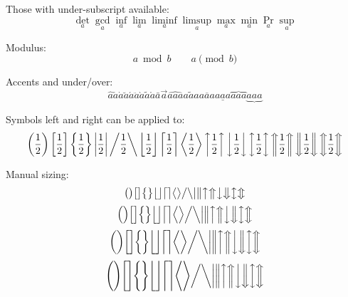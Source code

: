 \documentclass[12pt,a4paper]{article}
\begin{document}
Those with under-subscript available:
\begin{equation}
\det_{a} \gcd_{a} \inf_{a} \lim_{a} \liminf_{a} \limsup_{a} \max_{a} \min_{a} \Pr_{a} \sup_{a}
\end{equation}

Modulus:
\begin{equation}
a \bmod b \qquad a \pmod{b}
\end{equation}

Accents and under/over:
\begin{equation}
\hat{a} \check{a} \dot{a} \breve{a} \acute{a} \ddot{a} \grave{a} \tilde{a} \mathring{a} \bar{a} \vec{a} \widehat{aaa} \widetilde{aaa} \overline{aaa} \underline{aaa} \overbrace{aaa} \underbrace{aaa}
\end{equation}

Symbols left and right can be applied to:
\begin{equation}
\left( \frac{1}{2} \right) \left[ \frac{1}{2} \right] \left\{ \frac{1}{2} \right\} \left| \frac{1}{2} \right| \left/ \frac{1}{2} \right\backslash \left\lfloor \frac{1}{2} \right\rfloor \left\lceil \frac{1}{2} \right\rceil \left\langle \frac{1}{2} \right\rangle \left\uparrow \frac{1}{2} \right\uparrow \left\downarrow \frac{1}{2} \right\downarrow \left\updownarrow \frac{1}{2} \right\updownarrow \left\Uparrow \frac{1}{2} \right\Uparrow \left\Downarrow \frac{1}{2} \right\Downarrow \left\Updownarrow \frac{1}{2} \right\Updownarrow   
\end{equation}

Manual sizing:
\begin{equation}
\big( \big) \big[ \big] \big\{ \big\} \big\lfloor \big\rfloor \big\lceil \big\rceil \big\langle \big\rangle 
\big/ \big\backslash \big| \big\| \big\uparrow \big\Uparrow \big\downarrow \big\Downarrow \big\updownarrow \big\Updownarrow
\end{equation}
\begin{equation}
\Big( \Big) \Big[ \Big] \Big\{ \Big\} \Big\lfloor \Big\rfloor \Big\lceil \Big\rceil \Big\langle \Big\rangle 
\Big/ \Big\backslash \Big| \Big\| \Big\uparrow \Big\Uparrow \Big\downarrow \Big\Downarrow \Big\updownarrow \Big\Updownarrow
\end{equation}
\begin{equation}
\bigg( \bigg) \bigg[ \bigg] \bigg\{ \bigg\} \bigg\lfloor \bigg\rfloor \bigg\lceil \bigg\rceil \bigg\langle \bigg\rangle 
\bigg/ \bigg\backslash \bigg| \bigg\| \bigg\uparrow \bigg\Uparrow \bigg\downarrow \bigg\Downarrow \bigg\updownarrow \bigg\Updownarrow
\end{equation}
\begin{equation}
\Bigg( \Bigg) \Bigg[ \Bigg] \Bigg\{ \Bigg\} \Bigg\lfloor \Bigg\rfloor \Bigg\lceil \Bigg\rceil \Bigg\langle \Bigg\rangle 
\bigg/ \bigg\backslash \bigg| \bigg\| \bigg\uparrow \bigg\Uparrow \bigg\downarrow \bigg\Downarrow \bigg\updownarrow \bigg\Updownarrow
\end{equation}
\end{document}
